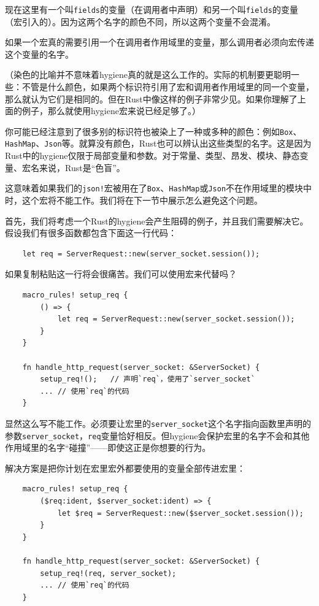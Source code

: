 现在这里有一个叫\texttt{fields}的变量（在调用者中声明）和另一个叫\texttt{fields}的变量（宏引入的）。因为这两个名字的颜色不同，所以这两个变量不会混淆。

如果一个宏真的需要引用一个在调用者作用域里的变量，那么调用者必须向宏传递这个变量的名字。

（染色的比喻并不意味着hygiene真的就是这么工作的。实际的机制要更聪明一些：不管是什么颜色，如果两个标识符引用了宏和调用者作用域里的同一个变量，那么就认为它们是相同的。但在Rust中像这样的例子非常少见。如果你理解了上面的例子，那么就使用hygiene宏来说已经足够了。）

你可能已经注意到了很多别的标识符也被染上了一种或多种的颜色：例如\texttt{Box}、\texttt{HashMap}、\texttt{Json}等。就算没有颜色，Rust也可以辨认出这些类型的名字。这是因为Rust中的hygiene仅限于局部变量和参数。对于常量、类型、昂发、模块、静态变量、宏名来说，Rust是“色盲”。

这意味着如果我们的\texttt{json!}宏被用在了\texttt{Box}、\texttt{HashMap}或\texttt{Json}不在作用域里的模块中时，这个宏将不能工作。我们将在下一节中展示怎么避免这个问题。

首先，我们将考虑一个Rust的hygiene会产生阻碍的例子，并且我们需要解决它。假设我们有很多函数都包含下面这一行代码：
\begin{verbatim}
    let req = ServerRequest::new(server_socket.session());
\end{verbatim}

如果复制粘贴这一行将会很痛苦。我们可以使用宏来代替吗？
\begin{verbatim}
    macro_rules! setup_req {
        () => {
            let req = ServerRequest::new(server_socket.session());
        }
    }

    fn handle_http_request(server_socket: &ServerSocket) {
        setup_req!();   // 声明`req`，使用了`server_socket`
        ... // 使用`req`的代码
    }
\end{verbatim}

显然这么写不能工作。必须要让宏里的\texttt{server\_socket}这个名字指向函数里声明的参数\texttt{server\_socket}，\texttt{req}变量恰好相反。但hygiene会保护宏里的名字不会和其他作用域里的名字“碰撞”——即使这正是你想要的行为。

解决方案是把你计划在宏里宏外都要使用的变量全部传进宏里：
\begin{verbatim}
    macro_rules! setup_req {
        ($req:ident, $server_socket:ident) => {
            let $req = ServerRequest::new($server_socket.session());
        }
    }

    fn handle_http_request(server_socket: &ServerSocket) {
        setup_req!(req, server_socket);
        ... // 使用`req`的代码
    }
\end{verbatim}

